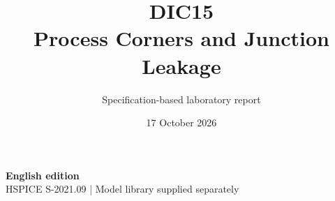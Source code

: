 \documentclass[11pt,a4paper]{article}
\title{\color{accent}DIC15\\[4pt]Process Corners and Junction Leakage}
\author{Specification-based laboratory report}
\date{17 October 2026}
\begin{document}
\maketitle
\begin{center}\small\textbf{English edition}\\
HSPICE S-2021.09 \quad | \quad Model library supplied separately
\end{center}


\end{document}
